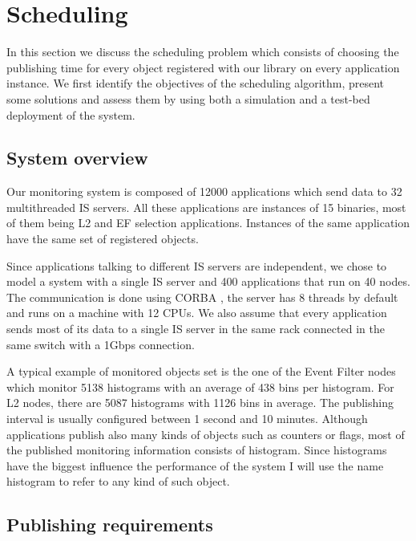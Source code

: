 \chapter{Scheduling} %
\label{Capitolul4}


In this section we discuss the scheduling problem which consists of choosing the publishing time for every object registered with our library on every application instance. We first identify the objectives of the scheduling algorithm, present some solutions and assess them by using both a simulation and a test-bed deployment of the system. 

\section*{System overview}

Our monitoring system is composed of 12000 applications which send data to 32 multithreaded IS servers.  All these applications are instances of 15 binaries, most of them being L2 and EF selection applications. Instances of the same application have the same set of registered objects.

Since applications talking to different IS servers are independent, we chose to model a system with a single IS server and 400 applications that run on 40 nodes. The communication is done using CORBA \citep{vinoski1997corba}, the server has 8 threads by default and runs on a machine with 12 CPUs. We also assume that every application sends most of its data to a single IS server in the same rack connected in the same switch with a 1Gbps connection.

A typical example of monitored objects set is the one of the Event Filter nodes which monitor 5138 histograms with an average of 438 bins per histogram. For L2 nodes, there are 5087 histograms with 1126 bins in average. The publishing interval is usually configured between 1 second and 10 minutes. Although applications publish also many kinds of objects such as counters or flags, most of the published monitoring information consists of histogram. Since histograms have the biggest influence the performance of the system I will use the name histogram to refer to any kind of such object.

\section*{Publishing requirements}

